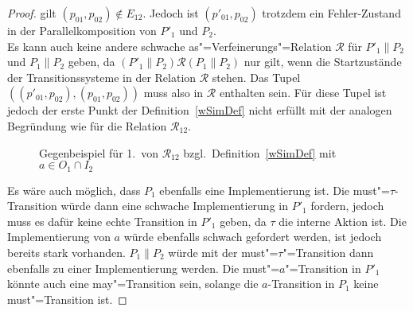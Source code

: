 \begin{proof}
  gilt $(p_{01},p_{02})\notin E_{12}$. Jedoch ist $(p'_{01},p_{02})$ trotzdem
  ein Fehler-Zustand in der Parallelkomposition von $P'_1$ und $P_2$.\\
  Es kann auch keine andere schwache as"=Verfeinerungs"=Relation $\mathcal{R}$
  für $P'_1\|P_2$ und $P_1\|P_2$ geben, da $(P'_1\|P_2) \mathcal{R} (P_1\|P_2)$
  nur gilt, wenn die Startzustände der Transitionssysteme in der Relation
  $\mathcal{R}$ stehen. Das Tupel $((p'_{01},p_{02}),(p_{01},p_{02}))$ muss
  also in $\mathcal{R}$ enthalten sein. Für diese Tupel ist jedoch der erste
  Punkt der Definition~\ref{wSimDef} nicht erfüllt mit der analogen Begründung
  wie für die Relation $\mathcal{R}_{12}$.

  \begin{figure}[h!tbp]
    \begin{center}
      \caption{Gegenbeispiel für 1.\ von $\mathcal{R}_{12}$ bzgl.\
      Definition~\ref{wSimDef} mit $a\in O_1\cap I_2$}
      \label{bsp1wSim}
    \end{center}
  \end{figure}

  Es wäre auch möglich, dass $P_1$ ebenfalls eine Implementierung ist. Die
  must"=$\tau$-Transition würde dann eine schwache Implementierung in $P'_1$
  fordern, jedoch muss es dafür keine echte Transition in $P'_1$ geben, da
  $\tau$ die interne Aktion ist. Die Implementierung von $a$ würde ebenfalls
  schwach gefordert werden, ist jedoch bereits stark vorhanden. $P_1\|P_2$
  würde mit der must"=$\tau$"=Transition dann ebenfalls zu einer
  Implementierung werden. Die must"=$a$"=Transition in $P'_1$ könnte auch eine
  may"=Transition sein, solange die $a$-Transition in $P_1$ keine
  must"=Transition ist.
\end{proof}

